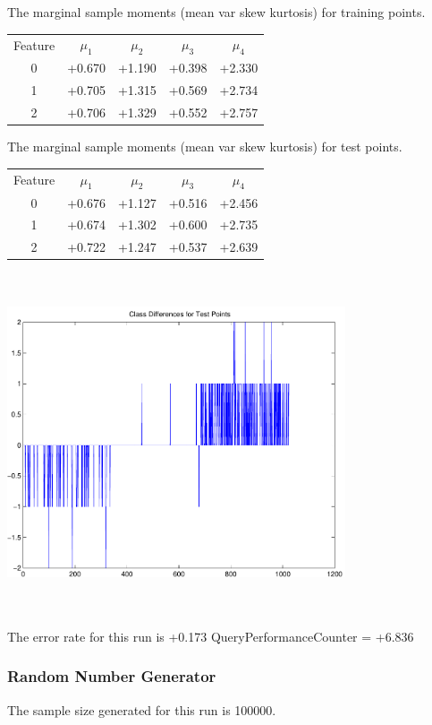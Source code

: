 \documentclass[12pt]{article}
\theoremstyle{definition}
\theoremstyle{remark}
\numberwithin{equation}{section}
\begin{document}
The marginal sample moments (mean var skew kurtosis) for training points.\newline
\begin{tabular}{ c |  c  c  c  c}
Feature & $\mu_1$ & $\mu_2$ & $\mu_3$ & $\mu_4$ \\
0 & +0.670 & +1.190 & +0.398& +2.330 \\
\hline
1 & +0.705 & +1.315 & +0.569& +2.734 \\
\hline
2 & +0.706 & +1.329 & +0.552& +2.757 \\
\hline
\end{tabular}
\newline
The marginal sample moments (mean var skew kurtosis) for test points.\newline
\begin{tabular}{ c | c  c  c  c}
Feature & $\mu_1$ & $\mu_2$ & $\mu_3$ & $\mu_4$ \\
0 & +0.676 & +1.127 & +0.516& +2.456\\
\hline
1 & +0.674 & +1.302 & +0.600& +2.735\\
\hline
2 & +0.722 & +1.247 & +0.537& +2.639\\
\hline
\end{tabular}\newline
\includegraphics[width=10.0cm,height=10.0cm]{classDiffs.pdf}

The error rate for this run is +0.173\newline
QueryPerformanceCounter  =  +6.836
\subsubsection{Random Number Generator }
The sample size generated for this run is 100000.
\end{document}
